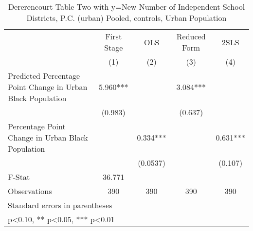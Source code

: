 \begin{table}[htbp]\centering
\def\sym#1{\ifmmode^{#1}\else\(^{#1}\)\fi}
\caption{Dererencourt Table Two with y=New Number of Independent School Districts, P.C. (urban)  Pooled,  controls, Urban Population}
\begin{tabular}{l*{4}{c}}
\toprule
                    & First Stage   &         OLS   &Reduced Form   &        2SLS   \\
                    &\multicolumn{1}{c}{(1)}   &\multicolumn{1}{c}{(2)}   &\multicolumn{1}{c}{(3)}   &\multicolumn{1}{c}{(4)}   \\
\midrule
Predicted Percentage Point Change in Urban Black Population&       5.960***&               &       3.084***&               \\
                    &     (0.983)   &               &     (0.637)   &               \\
\addlinespace
Percentage Point Change in Urban Black Population&               &       0.334***&               &       0.631***\\
                    &               &    (0.0537)   &               &     (0.107)   \\
\midrule
F-Stat              &      36.771   &               &               &               \\
Observations        &         390   &         390   &         390   &         390   \\
\bottomrule
\multicolumn{5}{l}{\footnotesize Standard errors in parentheses}\\
\multicolumn{5}{l}{\footnotesize * p<0.10, ** p<0.05, *** p<0.01}\\
\end{tabular}
\end{table}
